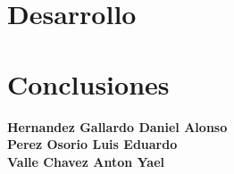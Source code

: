 \documentclass{report}
\begin{document}
\newpage
\chapter{Desarrollo}

\chapter{Conclusiones}
\textbf{Hernandez Gallardo Daniel Alonso} \\
\newpage
\textbf{Perez Osorio Luis Eduardo} \\

\newpage
\textbf{Valle Chavez Anton Yael} \\
\newpage
\nocite{*}
  \newpage

\end{document}
